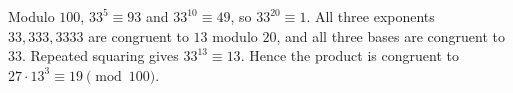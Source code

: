 Modulo $100$, $33^5\equiv93$ and $33^{10}\equiv49$, so $33^{20}\equiv1$. All three exponents $33,333,3333$ are congruent to $13$ modulo $20$, and all three bases are congruent to $33$. Repeated squaring gives $33^{13}\equiv13$. Hence the product is congruent to $27\cdot13^3\equiv\boxed{19}\pmod{100}$.
